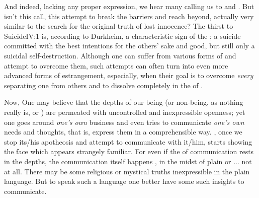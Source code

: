 And indeed, lacking any proper expression, we hear many calling us to  and . But isn't this call, this attempt to
break the barriers and reach beyond, actually very similar to the search for the
original truth of lost innocence? The thirst to \citet{get rid of one's personal
  ego and become embraced by the otherness which one believes to be one's
  essence}{Suicide}{IV:1 } is, according to Durkheim, a
characteristic sign of the ; a suicide committed with
the best intentions for the others' sake and good, but still only a suicidal
self-destruction. Although one can suffer from various forms of 
and attempt to overcome them, such attempts can often turn into even more
advanced forms of estrangement, especially, when their goal is to overcome {\em
  every}  separating one from others and to dissolve 
completely in the  of .

\pa Now,  One may believe that the depths of our being (or non-being,
as nothing really is, or ) are permeated with uncontrolled and
inexpressible openness; yet one goes around {\em one's own} business and even
tries to communicate {\em one's own} needs and thoughts, that is, express them
in a comprehensible way. , once we stop its/his apotheosis and
attempt to communicate with it/him, starts showing the face which appears
strangely familiar. For even if the  of communication rests in
the  depths, the communication itself happens , in
the midst of plain  or ... not at all. There may be some religious
or mystical truths inexpressible in the plain language. But to speak such a
language one better have some such insights to communicate.

